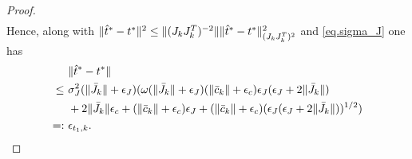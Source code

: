 \begin{proof}
\begin{align*}
  \end{align*}
  Hence, along with $\| {\hat t}^* - t^* \|^2 \leq \|(J_k J_k^T)^{-2} \| \| {\hat t}^* - t^* \|_{(J_k J_k^T)^2}^2$ and \eqref{eq.sigma_J} one has  
   \begin{align}
     &\ \| {\hat t}^* - t^* \| \nonumber \\
     \leq&\ \sigma_J^2 (\|{\bar J}_k\| + \epsilon_J) (\omega (\|{\bar J}_k\| + \epsilon_J) (\|{\bar c}_k \| + \epsilon_c) \epsilon_J ( \epsilon_J + 2 \|{\bar J}_k\| ) \nonumber \\
     &\ + 2 \|{\bar J}_k\| \epsilon_c + (\|{\bar c}_k\| + \epsilon_c) \epsilon_J + (\|{\bar c}_k\| + \epsilon_c) (\epsilon_J ( \epsilon_J + 2 \|{\bar J}_k\| ))^{1/2} ) \nonumber \\
     = :&\ \epsilon_{t_1,k}. \label{eq.that_ttilde_diff}
  \end{align}
  

\end{proof}
